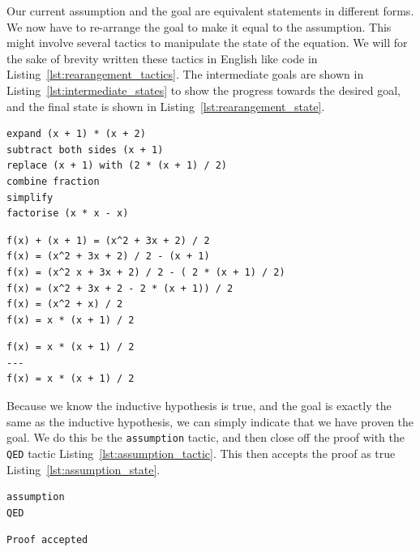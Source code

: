 \documentclass[
]{article}
\newcommand{\passthrough}[1]{#1}
\begin{document}
Our current assumption and the goal are equivalent statements in
different forms. We now have to re-arrange the goal to make it equal to
the assumption. This might involve several tactics to manipulate the
state of the equation. We will for the sake of brevity written these
tactics in English like code in Listing~\ref{lst:rearangement_tactics}.
The intermediate goals are shown in
Listing~\ref{lst:intermediate_states} to show the progress towards the
desired goal, and the final state is shown in
Listing~\ref{lst:rearangement_state}.

\begin{lstlisting}[caption={Running re-arangement tactics}, label=lst:rearangement_tactics]
expand (x + 1) * (x + 2)
subtract both sides (x + 1)
replace (x + 1) with (2 * (x + 1) / 2)
combine fraction
simplify
factorise (x * x - x)
\end{lstlisting}

\begin{lstlisting}[caption={States after running each tactic}, label=lst:intermediate_states]
f(x) + (x + 1) = (x^2 + 3x + 2) / 2
f(x) = (x^2 + 3x + 2) / 2 - (x + 1)
f(x) = (x^2 x + 3x + 2) / 2 - ( 2 * (x + 1) / 2)
f(x) = (x^2 + 3x + 2 - 2 * (x + 1)) / 2
f(x) = (x^2 + x) / 2
f(x) = x * (x + 1) / 2
\end{lstlisting}

\begin{lstlisting}[caption={Final state after running each tactic}, label=lst:rearangement_state]
f(x) = x * (x + 1) / 2
---
f(x) = x * (x + 1) / 2
\end{lstlisting}

Because we know the inductive hypothesis is true, and the goal is
exactly the same as the inductive hypothesis, we can simply indicate
that we have proven the goal. We do this be the
\passthrough{\lstinline!assumption!} tactic, and then close off the
proof with the \passthrough{\lstinline!QED!} tactic
Listing~\ref{lst:assumption_tactic}. This then accepts the proof as true
Listing~\ref{lst:assumption_state}.

\begin{lstlisting}[caption={Running the assumption tactic}, label=lst:assumption_tactic]
assumption
QED
\end{lstlisting}

\begin{lstlisting}[caption={State after running the assumption tactic}, label=lst:assumption_state]
Proof accepted
\end{lstlisting}
\end{document}
